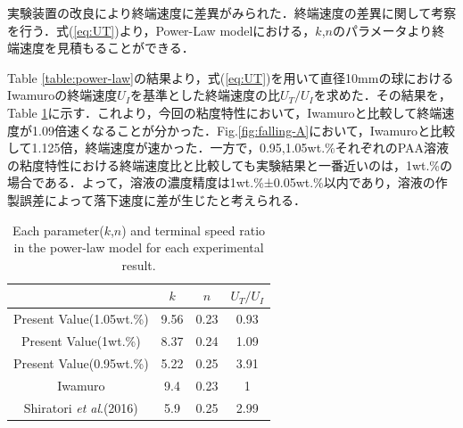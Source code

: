 実験装置の改良により終端速度に差異がみられた．終端速度の差異に関して考察を行う．式(\ref{eq:UT})より，Power-Law modelにおける，$k$,$n$のパラメータより終端速度を見積もることができる．

Table \ref{table:power-law}の結果より，式(\ref{eq:UT})を用いて直径10mmの球におけるIwamuro\cite{ref:8}の終端速度$U_I$を基準とした終端速度の比$U_T/U_{I}$を求めた．その結果を，Table \ref{table:UT}に示す．これより，今回の粘度特性において，Iwamuro\cite{ref:8}と比較して終端速度が1.09倍速くなることが分かった．Fig.\ref{fig:falling-A}において，Iwamuro\cite{ref:8}と比較して1.125倍，終端速度が速かった．一方で，0.95,1.05wt.\%それぞれのPAA溶液の粘度特性における終端速度比と比較しても実験結果と一番近いのは，1wt.\%の場合である．よって，溶液の濃度精度は1wt.\%±0.05wt.\%以内であり，溶液の作製誤差によって落下速度に差が生じたと考えられる．

\begin{table}[h]
    \centering
    \caption{Each parameter($k$,$n$) and terminal speed ratio in the power-law model for each experimental result.}
    \label{table:UT}
    \begin{tabular}{c|c|c|c} \hline
                                                     & $k$  & $n$  & $U_T/U_{I}$ \\ \hline \hline
        Present Value(1.05wt.\%)                     & 9.56 & 0.23 & 0.93        \\
        Present Value(1wt.\%)                        & 8.37 & 0.24 & 1.09        \\
        Present Value(0.95wt.\%)                     & 5.22 & 0.25 & 3.91        \\
        Iwamuro\cite{ref:8}                          & 9.4  & 0.23 & 1           \\
        Shiratori \textit{et al}.(2016)\cite{ref:10} & 5.9  & 0.25 & 2.99        \\ \hline
    \end{tabular}
\end{table}

